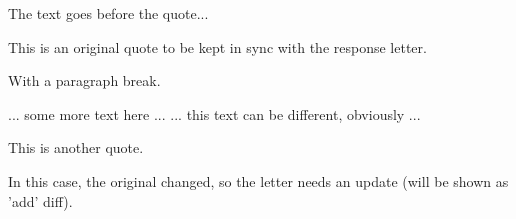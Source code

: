 
The text goes before the quote...

This is an original quote
to be kept in sync with the response letter.

With a paragraph break.


... some more text here ...
... this text can be different, obviously ...

This is another quote.

In this case, the original changed, so the letter needs an update
(will be shown as 'add' diff).

